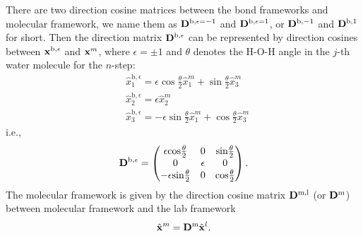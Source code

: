 There are two direction cosine matrices between the bond frameworks and molecular framework,
we name them as ${\bf D}^{\text{b},\epsilon=-1}$ and  ${\bf D}^{\text{b},\epsilon=1}$, \cite{Khatib2017}
or ${\bf D}^{\text{b},-1}$ and  ${\bf D}^{\text{b},1}$ for short. 
Then the direction matrix ${\bf D}^{\text{b},\epsilon} $ can be represented by direction cosines between ${\bf x}^{\text{b},\epsilon}$ and ${\bf x}^m$, 
where $\epsilon=\pm 1$ and $\theta$ denotes the H-O-H angle in the $j$-th water molecule for the $n$-step:
\begin{subequations}
\begin{align}
  &\hat x^{\text{b},\epsilon}_1 = \epsilon \cos\frac{\theta}{2} \hat x^m_1 +  \sin\frac{\theta}{2} \hat x^m_3 \\
  &\hat x^{\text{b},\epsilon}_2 = \epsilon \hat x^m_2 \\
  &\hat x^{\text{b},\epsilon}_3 = -\epsilon \sin\frac{\theta}{2} \hat x^m_1 + \cos\frac{\theta}{2} \hat x^m_3
\end{align}
\end{subequations}
i.e., 
\begin{equation}
  {\bf D}^{\text{b},\epsilon} =\left(
  \begin{matrix}
    \epsilon\text{cos}\frac{\theta}{2} &  0  & \text{sin}\frac{\theta}{2}\\
    0 & \epsilon & 0\\
    -\epsilon\text{sin}\frac{\theta}{2} & 0 & \text{cos}\frac{\theta}{2}
  \end{matrix}
  \right).
\end{equation}
  The molecular framework is given by the direction cosine matrix ${\bf D}^\text{m,l}$ (or ${\bf D}^\text{m}$) between molecular framework  and the lab framework
%
\begin{subequations}
\begin{align}
  \hat {\bf x}^m ={\bf D}^\text{m} \hat{\bf x}^l.
\end{align}
\end{subequations}

